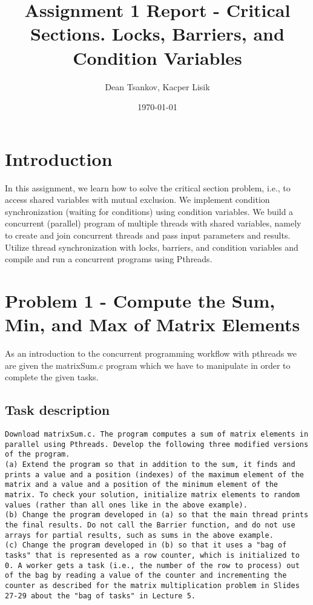 \documentclass[a4paper,11pt]{article}
\begin{document}
\title{
    \textbf{Assignment 1 Report - Critical Sections. Locks, Barriers, and Condition Variables}
}
\author{Dean Tsankov, Kacper Lisik}
\date{\today}

\maketitle

\section*{Introduction}
In this assignment, we learn how to solve the critical section problem, i.e., to access shared variables with mutual exclusion. We implement condition synchronization (waiting for conditions) using condition variables. We build a concurrent (parallel) program of multiple threads with shared variables, namely
to create and join concurrent threads and pass input parameters and results. Utilize thread synchronization with locks, barriers, and condition variables and
compile and run a concurrent programs using Pthreads.


\section*{Problem 1 - Compute the Sum, Min, and Max of Matrix Elements}

As an introduction to the concurrent programming workflow with pthreads we are given the matrixSum.c program which we have to manipulate in order to complete the given tasks.

\subsection*{Task description}

\begin{verbatim}
Download matrixSum.c. The program computes a sum of matrix elements in parallel using Pthreads. Develop the following three modified versions of the program.
(a) Extend the program so that in addition to the sum, it finds and prints a value and a position (indexes) of the maximum element of the matrix and a value and a position of the minimum element of the matrix. To check your solution, initialize matrix elements to random values (rather than all ones like in the above example).
(b) Change the program developed in (a) so that the main thread prints the final results. Do not call the Barrier function, and do not use arrays for partial results, such as sums in the above example.
(c) Change the program developed in (b) so that it uses a "bag of tasks" that is represented as a row counter, which is initialized to 0. A worker gets a task (i.e., the number of the row to process) out of the bag by reading a value of the counter and incrementing the counter as described for the matrix multiplication problem in Slides 27-29 about the "bag of tasks" in Lecture 5.
\end{verbatim}
\end{document}
